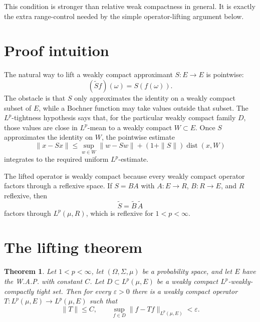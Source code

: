 \documentclass[11pt]{article}
\newtheorem{theorem}{Theorem}
\newcommand{\dist}{\operatorname{dist}}
\newcommand{\eps}{\varepsilon}
\begin{document}
This condition is stronger than relative weak compactness in general.  It is exactly the extra range-control needed by the simple operator-lifting argument below.

\section{Proof intuition}

The natural way to lift a weakly compact approximant \(S:E\to E\) is pointwise:
\[
  (\widetilde S f)(\omega)=S(f(\omega)).
\]
The obstacle is that \(S\) only approximates the identity on a weakly compact subset of \(E\), while a Bochner function may take values outside that subset.  The \(L^p\)-tightness hypothesis says that, for the particular weakly compact family \(D\), those values are close in \(L^p\)-mean to a weakly compact \(W\subset E\).  Once \(S\) approximates the identity on \(W\), the pointwise estimate
\[
  \|x-Sx\|\le \sup_{w\in W}\|w-Sw\|+(1+\|S\|)\dist(x,W)
\]
integrates to the required uniform \(L^p\)-estimate.

The lifted operator is weakly compact because every weakly compact operator factors through a reflexive space.  If \(S=BA\) with \(A:E\to R\), \(B:R\to E\), and \(R\) reflexive, then
\[
  \widetilde S = \widetilde B\,\widetilde A
\]
factors through \(L^p(\mu,R)\), which is reflexive for \(1<p<\infty\).

\section{The lifting theorem}

\begin{theorem}\label{thm:tight-lift}
Let \(1<p<\infty\), let \((\Omega,\Sigma,\mu)\) be a probability space, and let \(E\) have the W.A.P. with constant \(C\).  Let \(D\subset L^p(\mu,E)\) be a weakly compact \(L^p\)-weakly-compactly tight set.  Then for every \(\eps>0\) there is a weakly compact operator \(T:L^p(\mu,E)\to L^p(\mu,E)\) such that
\[
  \|T\|\le C,\qquad \sup_{f\in D}\|f-Tf\|_{L^p(\mu,E)}<\eps .
\]
\end{theorem}
\end{document}
